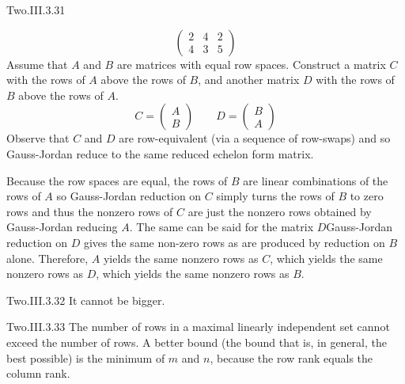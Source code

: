 \begin{ans}{Two.III.3.31}
\begin{exparts}
\begin{equation*}
\begin{pmatrix}
              2  &4  &2  \\
              4  &3  &5
            \end{pmatrix}
          \end{equation*}
        \partsitem Assume that \( A \) and \( B \) are matrices with equal
          row spaces.
          Construct a matrix \( C \) with the rows of \( A \) above the rows
          of \( B \), and another matrix \( D \) with the rows of \( B \)
          above the rows of \( A \).
          \begin{equation*}
            C=\begin{pmatrix}
                 A \\ B
              \end{pmatrix}
            \qquad
            D=\begin{pmatrix}
                 B \\ A
              \end{pmatrix}
          \end{equation*}
          Observe that \( C \) and \( D \) are row-equivalent (via a sequence
          of row-swaps) and so Gauss-Jordan reduce to the same reduced
          echelon form matrix.

          Because the row spaces are equal, the rows of \( B \)
          are linear combinations of the rows of \( A \) so Gauss-Jordan
          reduction on \( C \) simply turns the rows of \( B \) to zero rows
          and thus the nonzero rows of $C$ are just the nonzero rows obtained
          by Gauss-Jordan reducing \( A \).
          The same can be said for the matrix \( D \)\Dash Gauss-Jordan
          reduction on \( D \) gives the same non-zero rows as are produced
          by reduction on \( B \) alone.
          Therefore,
          \( A \) yields the same nonzero rows as \( C  \), which yields
          the same nonzero rows as \( D \), which yields the same nonzero
          rows as \( B \).
      \end{exparts}
    
\end{ans}
\begin{ans}{Two.III.3.32}
      It cannot be bigger.
    
\end{ans}
\begin{ans}{Two.III.3.33}
      The number of rows in a maximal linearly independent set cannot
      exceed the number of rows.
      A better bound (the bound that is, in general, the best possible) is
      the minimum of \( m \) and \( n \), because the row rank equals the
      column rank.
     
\end{ans}
